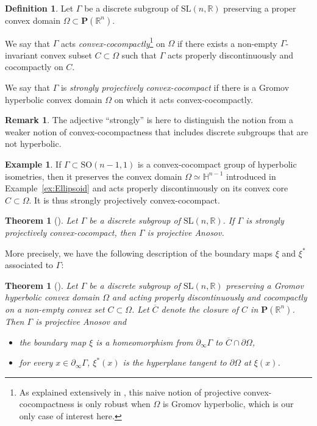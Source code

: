 \documentclass[JEP,XML,SOM,Unicode,NoEqCountersInSection,NoFloatCountersInSection,published]{cedram}
\newtheorem{theorem}[theo]{Theorem}
\theoremstyle{definition}
\newtheorem{defi}[theo]{Definition}
\newtheorem{example}[theo]{Example}
\newtheorem{rmk}[theo]{Remark}
\newcommand{\proj}{\mathbf{P}}
\newcommand{\R}{\mathbb{R}}
\newcommand{\Hyp}{\mathbb{H}}
\newcommand{\SL}{\mathrm{SL}}
\newcommand{\SO}{\mathrm{SO}}
\let\G\Gamma
\begin{document}
\begin{defi}\label{def - convex cocompact}
Let $\Gamma$ be a discrete subgroup of $\SL(n,\R)$ preserving a proper convex domain $\Omega\subset \proj(\R^n)$.

We say that $\Gamma$ acts \emph{convex-cocompactly}\footnote{As explained extensively in \cite{DGK}, this naive notion of projective convex-cocompactness is only robust when $\Omega$ is Gromov hyperbolic, which is our only case of interest here.} on $\Omega$ if there exists a non-empty $\Gamma$\nobreakdash-in\-vari\-ant convex subset $C\subset \Omega$ such that $\Gamma$ acts properly discontinuously and cocompactly on $C$.

We say that $\Gamma$ is \emph{strongly projectively convex-cocompact} if there is a Gromov hyperbolic convex domain $\Omega$ on which it acts convex-cocompactly.
\end{defi}

\begin{rmk}
The adjective ``strongly'' is here to distinguish the notion from a weaker notion of convex-cocompactness that includes discrete subgroups that are not hyperbolic.
\end{rmk}

\begin{example}
If $\Gamma \subset \SO(n-1,1)$ is a convex-cocompact group of hyperbolic isometries, then it preserves the convex domain $\Omega \simeq \Hyp^{n-1}$ introduced in Example~\ref{ex:Ellipsoid} and acts properly discontinuously on its convex core $C \subset \Omega$. It is thus strongly projectively convex-cocompact.
\end{example}

\begin{theorem}[\cite{DGK}]
Let $\G$ be a discrete subgroup of $\SL(n,\R)$. If $\G$ is strongly projectively convex-cocompact, then $\G$ is projective Anosov.
\end{theorem}

More precisely, we have the following description of the boundary maps $\xi$ and $\xi^*$ associated to $\Gamma$:

\begin{theorem}[\cite{DGK}] \label{theo - BoundaryMapsConvexCocompact}
Let $\Gamma$ be a discrete subgroup of $\SL(n,\R)$ preserving a Gromov hyperbolic convex domain $\Omega$ and acting properly discontinuously and cocompactly on a non-empty convex set $C\subset \Omega$. Let $\overline{C}$ denote the closure of $C$ in $\proj(\R^n)$. Then $\Gamma$ is projective Anosov and
\begin{itemize}
\item the boundary map $\xi$ is a homeomorphism from $\partial_\infty \Gamma$ to $\overline{C} \cap \partial \Omega$,
\item for every $x\in \partial_\infty \Gamma$, $\xi^*(x)$ is the hyperplane tangent to $\partial \Omega$ at $\xi(x)$.
\end{itemize}
\end{theorem}
\end{document}

